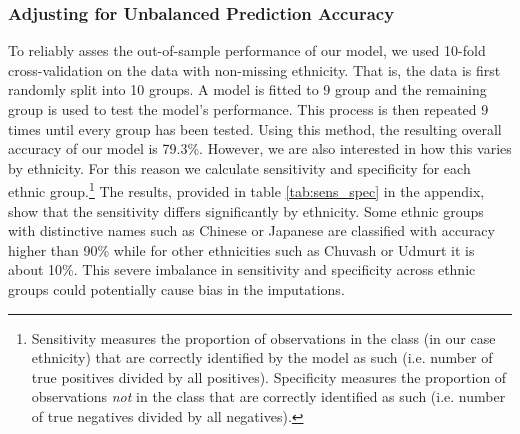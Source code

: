 \subsubsection{Adjusting for Unbalanced Prediction Accuracy} \label{subsubsec:pred_adj}
To reliably asses the out-of-sample performance of our model, we used 10-fold cross-validation on the data with non-missing ethnicity. That is, the data is first randomly split into 10 groups. A model is fitted to 9 group and the remaining group is used to test the model's performance. This process is then repeated 9 times  until every group has been tested. 
Using this method, the resulting overall accuracy of our model is 79.3\%. However,  we are also interested in  how this varies by ethnicity.
For this reason we calculate sensitivity and specificity for each ethnic group.\footnote{Sensitivity measures the proportion of observations in the class (in our case ethnicity) that are correctly identified by the model as such (i.e. number of true positives divided by all positives). Specificity measures the proportion of observations \emph{not} in the class that are correctly identified as such (i.e. number of true negatives divided by all negatives).} 
The results, provided in table \ref{tab:sens_spec} in the appendix, show that the sensitivity differs significantly by ethnicity. 
Some ethnic groups with distinctive names such as Chinese or Japanese are classified  with accuracy higher than 90\%  while for other ethnicities such as Chuvash or Udmurt it is about 10\%. This severe imbalance in sensitivity and specificity  across ethnic groups could potentially cause bias in the imputations. 

